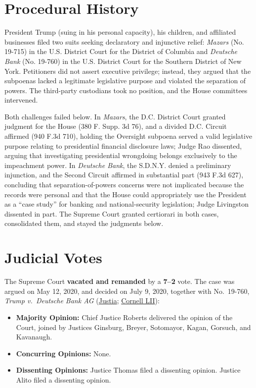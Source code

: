 \documentclass[12pt]{article}
\begin{document}
\section{Procedural History}
President Trump (suing in his personal capacity), his children, and affiliated businesses filed two suits seeking declaratory and injunctive relief: \textit{Mazars} (No. 19-715) in the U.S. District Court for the District of Columbia and \textit{Deutsche Bank} (No. 19-760) in the U.S. District Court for the Southern District of New York. Petitioners did not assert executive privilege; instead, they argued that the subpoenas lacked a legitimate legislative purpose and violated the separation of powers. The third-party custodians took no position, and the House committees intervened.

Both challenges failed below. In \textit{Mazars}, the D.C. District Court granted judgment for the House (380 F. Supp. 3d 76), and a divided D.C. Circuit affirmed (940 F.3d 710), holding the Oversight subpoena served a valid legislative purpose relating to presidential financial disclosure laws; Judge Rao dissented, arguing that investigating presidential wrongdoing belongs exclusively to the impeachment power. In \textit{Deutsche Bank}, the S.D.N.Y. denied a preliminary injunction, and the Second Circuit affirmed in substantial part (943 F.3d 627), concluding that separation-of-powers concerns were not implicated because the records were personal and that the House could appropriately use the President as a ``case study'' for banking and national-security legislation; Judge Livingston dissented in part. The Supreme Court granted certiorari in both cases, consolidated them, and stayed the judgments below.

\section{Judicial Votes}
The Supreme Court \textbf{vacated and remanded} by a \textbf{7--2} vote. The case was argued on May 12, 2020, and decided on July 9, 2020, together with No.\ 19-760, \textit{Trump v.\ Deutsche Bank AG} (\href{https://supreme.justia.com/cases/federal/us/591/19-715/}{Justia}; \href{https://www.law.cornell.edu/supremecourt/text/19-715}{Cornell LII}):

\begin{itemize}
    \item \textbf{Majority Opinion:} Chief Justice Roberts delivered the opinion of the Court, joined by Justices Ginsburg, Breyer, Sotomayor, Kagan, Gorsuch, and Kavanaugh.
    \item \textbf{Concurring Opinions:} None.
    \item \textbf{Dissenting Opinions:} Justice Thomas filed a dissenting opinion. Justice Alito filed a dissenting opinion.
\end{itemize}
\end{document}

